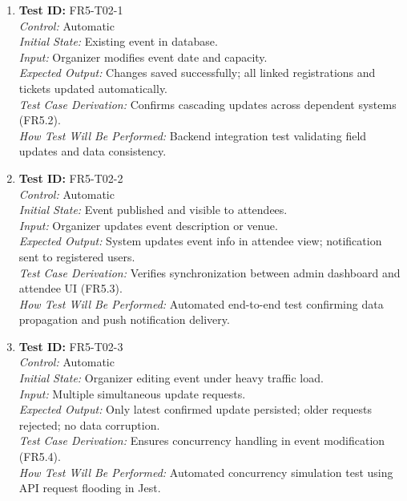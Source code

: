 \documentclass[12pt, titlepage]{article}
\begin{document}
\begin{enumerate}\setlength{\itemsep}{1em}
    \item \textbf{Test ID:} FR5-T02-1\\[0.5em]
    \textit{Control:} Automatic\\[0.3em]
    \textit{Initial State:} Existing event in database.\\[0.3em]
    \textit{Input:} Organizer modifies event date and capacity.\\[0.3em]
    \textit{Expected Output:} Changes saved successfully; all linked registrations and tickets updated automatically.\\[0.3em]
    \textit{Test Case Derivation:} Confirms cascading updates across dependent systems (FR5.2).\\[0.3em]
    \textit{How Test Will Be Performed:} Backend integration test validating field updates and data consistency.

    \item \textbf{Test ID:} FR5-T02-2\\[0.5em]
    \textit{Control:} Automatic\\[0.3em]
    \textit{Initial State:} Event published and visible to attendees.\\[0.3em]
    \textit{Input:} Organizer updates event description or venue.\\[0.3em]
    \textit{Expected Output:} System updates event info in attendee view; notification sent to registered users.\\[0.3em]
    \textit{Test Case Derivation:} Verifies synchronization between admin dashboard and attendee UI (FR5.3).\\[0.3em]
    \textit{How Test Will Be Performed:} Automated end-to-end test confirming data propagation and push notification delivery.

    \item \textbf{Test ID:} FR5-T02-3\\[0.5em]
    \textit{Control:} Automatic\\[0.3em]
    \textit{Initial State:} Organizer editing event under heavy traffic load.\\[0.3em]
    \textit{Input:} Multiple simultaneous update requests.\\[0.3em]
    \textit{Expected Output:} Only latest confirmed update persisted; older requests rejected; no data corruption.\\[0.3em]
    \textit{Test Case Derivation:} Ensures concurrency handling in event modification (FR5.4).\\[0.3em]
    \textit{How Test Will Be Performed:} Automated concurrency simulation test using API request flooding in Jest.
\end{enumerate}
\end{document}

